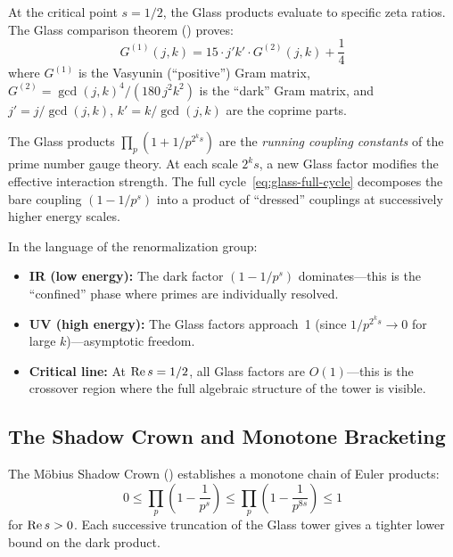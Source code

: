 At the critical point $s = 1/2$, the Glass products evaluate to
specific zeta ratios. The Glass comparison theorem
() proves:
\begin{equation}
  G^{(1)}(j,k) = 15 \cdot j'k' \cdot G^{(2)}(j,k) + \frac{1}{4}
  \label{eq:glass-comparison}
\end{equation}
where $G^{(1)}$ is the Vasyunin (``positive'') Gram matrix,
$G^{(2)} = \gcd(j,k)^4/(180\,j^2 k^2)$ is the ``dark'' Gram matrix,
and $j' = j/\gcd(j,k)$, $k' = k/\gcd(j,k)$ are the coprime parts.

\begin{correspondence}
The Glass products $\prod_p(1 + 1/p^{2^k s})$ are the
\emph{running coupling constants} of the prime number gauge theory.
At each scale $2^k s$, a new Glass factor modifies the effective
interaction strength. The full cycle~\eqref{eq:glass-full-cycle}
decomposes the bare coupling $(1 - 1/p^s)$ into a product of
``dressed'' couplings at successively higher energy scales.

In the language of the renormalization group:
\begin{itemize}
  \item \textbf{IR (low energy):} The dark factor $(1 - 1/p^s)$
    dominates---this is the ``confined'' phase where primes are
    individually resolved.
  \item \textbf{UV (high energy):} The Glass factors approach~1
    (since $1/p^{2^k s} \to 0$ for large $k$)---asymptotic
    freedom.
  \item \textbf{Critical line:} At $\operatorname{Re} s = 1/2$, all Glass factors
    are $O(1)$---this is the crossover region where the full
    algebraic structure of the tower is visible.
\end{itemize}
\end{correspondence}

\subsection{The Shadow Crown and Monotone Bracketing}

The M\"obius Shadow Crown () establishes
a monotone chain of Euler products:
\begin{equation}
  0 \leq \prod_p \left(1 - \frac{1}{p^s}\right)
  \leq \prod_p \left(1 - \frac{1}{p^{8s}}\right)
  \leq 1
  \label{eq:shadow-crown}
\end{equation}
for $\operatorname{Re} s > 0$. Each successive truncation of the Glass tower
gives a tighter lower bound on the dark product.

